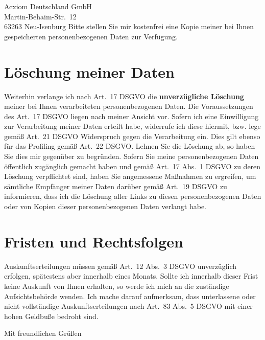 \documentclass[a4paper,DIV=11]{scrartcl}
\begin{document}
\begin{letter}{%
Acxiom Deutschland GmbH\\
Martin-Behaim-Str.\ 12\\
63263 Neu-Isenburg
}
Bitte stellen Sie mir kostenfrei eine Kopie meiner bei Ihnen gespeicherten personenbezogenen Daten zur Verfügung.

\section{Löschung meiner Daten}

Weiterhin verlange ich nach Art.\ 17 DSGVO die \textbf{unverzügliche Löschung} meiner bei Ihnen verarbeiteten personenbezogenen Daten.
Die Voraussetzungen des Art.\ 17 DSGVO liegen nach meiner Ansicht vor. Sofern ich eine Einwilligung zur Verarbeitung meiner Daten erteilt habe, widerrufe ich diese hiermit, bzw. lege gemäß Art.\ 21 DSGVO Widerspruch gegen die Verarbeitung ein. Dies gilt ebenso für das Profiling gemäß Art.\ 22 DSGVO. Lehnen Sie die Löschung ab, so haben Sie dies mir gegenüber zu begründen.
Sofern Sie meine personenbezogenen Daten öffentlich zugänglich gemacht haben und gemäß Art.\ 17 Abs.\ 1 DSGVO zu deren Löschung verpflichtet sind, haben Sie angemessene Maßnahmen zu ergreifen, um sämtliche Empfänger meiner Daten darüber gemäß Art.\ 19 DSGVO zu informieren, dass ich die Löschung aller Links zu diesen personenbezogenen Daten oder von Kopien dieser personenbezogenen Daten verlangt habe.


\section{Fristen und Rechtsfolgen}

Auskunftserteilungen müssen gemäß Art.\ 12 Abs.\ 3 DSGVO unverzüglich erfolgen, spätestens aber innerhalb eines Monats. Sollte ich innerhalb dieser Frist keine Auskunft von Ihnen erhalten, so werde ich mich an die zuständige Aufsichtsbehörde wenden. Ich mache darauf aufmerksam, dass unterlassene oder nicht vollständige Auskunftserteilungen nach Art.\ 83 Abs.\ 5 DSGVO mit einer hohen Geldbuße bedroht sind.


\closing{Mit freundlichen Grüßen}

\end{letter}
\end{document}
